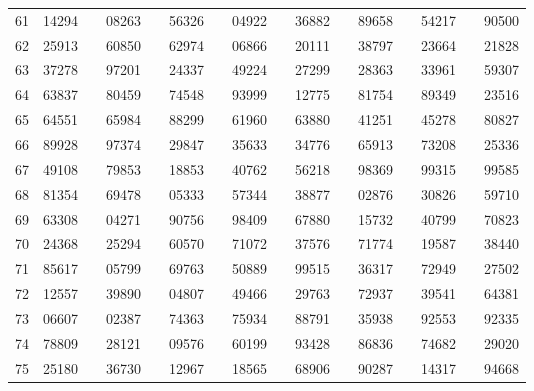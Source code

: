 \begin{center}
\begin{tabular}{cccc cccc cccc cccc}
\hline
61 & 14294 & \quad & 08263 & \quad & 56326 & \quad & 04922 & \quad & 36882 & \quad & 89658 & \quad & 54217 & \quad & 90500 \\
62 & 25913 & \quad & 60850 & \quad & 62974 & \quad & 06866 & \quad & 20111 & \quad & 38797 & \quad & 23664 & \quad & 21828 \\
63 & 37278 & \quad & 97201 & \quad & 24337 & \quad & 49224 & \quad & 27299 & \quad & 28363 & \quad & 33961 & \quad & 59307 \\
64 & 63837 & \quad & 80459 & \quad & 74548 & \quad & 93999 & \quad & 12775 & \quad & 81754 & \quad & 89349 & \quad & 23516 \\
65 & 64551 & \quad & 65984 & \quad & 88299 & \quad & 61960 & \quad & 63880 & \quad & 41251 & \quad & 45278 & \quad & 80827 \\
\hline
66 & 89928 & \quad & 97374 & \quad & 29847 & \quad & 35633 & \quad & 34776 & \quad & 65913 & \quad & 73208 & \quad & 25336 \\
67 & 49108 & \quad & 79853 & \quad & 18853 & \quad & 40762 & \quad & 56218 & \quad & 98369 & \quad & 99315 & \quad & 99585 \\
68 & 81354 & \quad & 69478 & \quad & 05333 & \quad & 57344 & \quad & 38877 & \quad & 02876 & \quad & 30826 & \quad & 59710 \\
69 & 63308 & \quad & 04271 & \quad & 90756 & \quad & 98409 & \quad & 67880 & \quad & 15732 & \quad & 40799 & \quad & 70823 \\
70 & 24368 & \quad & 25294 & \quad & 60570 & \quad & 71072 & \quad & 37576 & \quad & 71774 & \quad & 19587 & \quad & 38440 \\
\hline
71 & 85617 & \quad & 05799 & \quad & 69763 & \quad & 50889 & \quad & 99515 & \quad & 36317 & \quad & 72949 & \quad & 27502 \\
72 & 12557 & \quad & 39890 & \quad & 04807 & \quad & 49466 & \quad & 29763 & \quad & 72937 & \quad & 39541 & \quad & 64381 \\
73 & 06607 & \quad & 02387 & \quad & 74363 & \quad & 75934 & \quad & 88791 & \quad & 35938 & \quad & 92553 & \quad & 92335 \\
74 & 78809 & \quad & 28121 & \quad & 09576 & \quad & 60199 & \quad & 93428 & \quad & 86836 & \quad & 74682 & \quad & 29020 \\
75 & 25180 & \quad & 36730 & \quad & 12967 & \quad & 18565 & \quad & 68906 & \quad & 90287 & \quad & 14317 & \quad & 94668 \\
\hline
\end{tabular}
\end{center}

